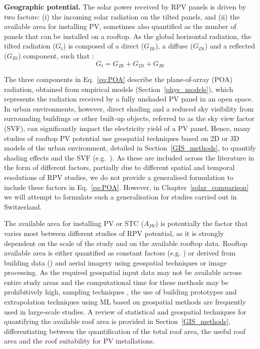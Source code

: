 \textbf{Geographic potential.} The solar power received by RPV panels is driven by two factors: (i) the incoming solar radiation on the tilted panels, and (ii) the available area for installing PV, sometimes also quantified as the number of panels that can be installed on a rooftop. As the global horizontal radiation, the tilted radiation ($G_t$) is composed of a direct ($G_{Bt}$), a diffuse ($G_{Dt}$) and a reflected ($G_{Rt}$) component, such that \cite{assouline_estimation_2017}:
\begin{equation}
\label{eq:POA}
G_{t} = G_{Bt} + G_{Dt} + G_{Rt}
\end{equation}

The three components in Eq.~\ref{eq:POA} describe the plane-of-array (POA) radiation, obtained from empirical models (Section~\ref{phys_models}), which represents the radiation received by a fully unshaded PV panel in an open space. 
In urban environments, however, direct shading and a reduced sky visibility from surrounding buildings or other built-up objects, referred to as the sky view factor (SVF), can significantly impact the electricity yield of a PV panel. 
Hence, many studies of rooftop PV potential use geospatial techniques based on 2D or 3D models of the urban environment, detailed in Section~\ref{GIS_methods}, to quantify shading effects and the SVF (e.g.~\cite{desthieux_solar_2018,calcabrini_simplified_2019,wegertseder_combining_2016,jakubiec_method_2013}).
As these are included across the literature in the form of different factors, partially due to different spatial and temporal resolutions of RPV studies, we do not provide a generalised formulation to include these factors in Eq.~\ref{eq:POA}. However, in Chapter~\ref{solar_comparison} we will attempt to formulate such a generalisation for studies carried out in Switzerland.

The available area for installing PV or STC ($A_{PV}$) is potentially the factor that varies most between different studies of RPV potential, as it is strongly dependent on the scale of the study and on the available rooftop data. 
Rooftop available area is either quantified as constant factors (e.g. \cite{iea_potential_2002,wegertseder_combining_2016,portmann_sonnendach.ch:_2016}) or derived from building data (\cite{ramirez_camargo_spatio-temporal_2015,assouline_quantifying_2017,hong_development_2017}) and aerial imagery \cite{mainzer_assessment_2017} using geospatial techniques or image processing. 
As the required geospatial input data may not be available across entire study areas and the computational time for these methods may be prohibitively high, sampling techniques \cite{izquierdo_method_2008}, the use of building prototypes \cite{wegertseder_combining_2016} and extrapolation techniques using ML \cite{assouline_quantifying_2017,assouline_large-scale_2018} based on geospatial methods are frequently used in large-scale studies. 
A review of statistical and geospatial techniques for quantifying the available roof area is provided in Section~\ref{GIS_methods}, differentiating between the quantification of the total roof area, the useful roof area and the roof suitability for PV installations.

